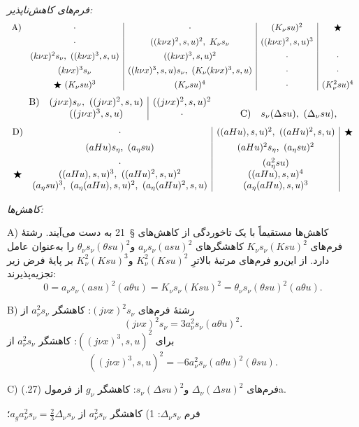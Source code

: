 \documentclass[11pt]{article}
\providecommand{\A}{\Delta}
\begin{document}
\noindent\emph{فرم‌های کاهش‌ناپذیر:}
\[
\begin{array}{c@{\quad}c|c|c|c}
\text{A)}& \cdot & \cdot & (K_\nu su)^2 & \bigstar\\[0.45em]
& \cdot & ((k\nu x)^2,s,u)^2,\ K_\nu s_\nu & ((k\nu x)^2,s,u)^3 & \\[0.45em]
& (k\nu x)^2s_\nu,\ ((k\nu x)^3,s,u) & ((k\nu x)^3,s,u)^2 & \cdot & \cdot\\[0.45em]
& (k\nu x)^3s_\nu & ((k\nu x)^3,s,u)s_\nu,\ (K_\nu(k\nu x)^3,s,u) & \cdot & \cdot\\[0.45em]
& \bigstar\ (K_\nu su)^3 & (K_\nu su)^4 & \cdot & (K_\nu^2su)^4
\end{array}
\]
\[
\begin{array}{c@{\quad}c|c@{\qquad}c@{\quad}c}
\text{B)}& (j\nu x)s_\nu,\ ((j\nu x)^2,s,u) & ((j\nu x)^2,s,u)^2 && \\
& ((j\nu x)^3,s,u) & \cdot && \text{C)}\quad s_\nu(\A su),\ (\A_\nu su),
\end{array}
\]
\[
\begin{array}{c@{\quad}c|c|c}
\text{D)}& \cdot & ((aHu),s,u)^2,\ ((aHu)^2,s,u) & \bigstar\\[0.45em]
& (aHu)s_\eta,\ (a_\eta su) & (aHu)^2s_\eta,\ (a_\eta su)^2 & \\[0.45em]
& \cdot & (a_\eta^2su) & \\
\bigstar& ((aHu),s,u)^3,\ ((aHu)^2,s,u)^2 & ((aHu),s,u)^4 & \\
& (a_\eta su)^3,\ (a_\eta(aHu),s,u)^2,\ (a_\eta(aHu)^2,s,u) & (a_\eta(aHu),s,u)^3 &
\end{array}
\]

\noindent\emph{کاهش‌ها:}

A) کاهش‌ها مستقیماً با یک تاخوردگی از کاهش‌های \S\ 21 به دست می‌آیند. رشتهٔ فرم‌های $K_\nu s_\nu(Ksu)^2$ کاهشگرهای $a_\nu s_\nu(asu)^2$ و$\theta_\nu s_\nu(\theta su)^2$ را به‌عنوان عامل دارد. از این‌رو فرم‌های مرتبهٔ بالاترِ $K_\nu^2(Ksu)^2$ و$K_\nu^2(Ksu)^3$ بر پایهٔ فرض زیر تجزیه‌پذیرند:
\[
0=a_\nu s_\nu(asu)^2(a\theta u)=K_\nu s_\nu(Ksu)^2=\theta_\nu s_\nu(\theta su)^2(a\theta u).
\]

B) رشتهٔ فرم‌های $(j\nu x)^2s_\nu$: کاهشگر $a_\nu^2s_\nu$ از
\[
(j\nu x)^2s_\nu=3a_\nu^2s_\nu(a\theta u)^2.
\]
برای $((j\nu x)^3,s,u)^2$: کاهشگر $a_\nu^2s_\nu$ از
\[
((j\nu x)^3,s,u)^2=-6a_\nu^2s_\nu(a\theta u)^2(\theta su).
\]

C) فرم‌های $\A_\nu(\A su)^2$ و$s_\nu(\A su)^2$: کاهشگر $g_\nu$ از فرمول (27.)a.

فرم $\A_\nu s_\nu$: 1) کاهشگر $a_\nu^2s_\nu$ از $a_ga_\nu^2s_\nu=\frac23\A_\nu s_\nu$؛
\end{document}
